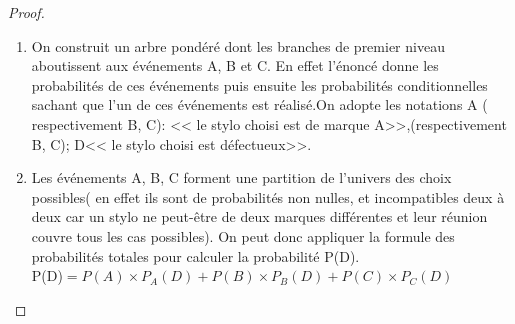 \begin{proof}
 \begin{enumerate}
  \item 
     On construit un arbre pondéré dont les branches de premier niveau aboutissent aux  événements A, B et C. En effet l'énoncé donne les probabilités   de ces événements  puis  ensuite les probabilités conditionnelles  sachant que l'un de ces événements est réalisé.\;On adopte  les notations A ( respectivement B, C):\; << le stylo  choisi est de marque A>>,(respectivement B, C); \; D\;<< le stylo choisi est défectueux>>.
  
   

\item   Les événements  A, B, C  forment une partition de l'univers des choix possibles\;( en effet ils sont de probabilités non nulles, et incompatibles deux à deux car un stylo ne peut-être de deux marques  différentes  et leur réunion couvre tous les cas possibles). On peut  donc appliquer la formule des probabilités totales  pour calculer la probabilité P(D). \\

P(D)$ =P(A)\times P_{A}(D)+P(B)\times P_{B}(D)+P(C)\times P_{C}(D)$\\


\end{enumerate}
\end{proof}
